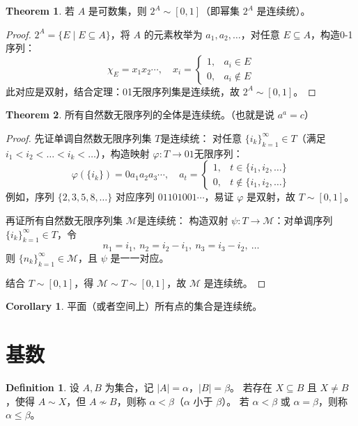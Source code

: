 \documentclass[oneside]{book}
\theoremstyle{definition}
\newtheorem{definition}{Definition}[section]
\newtheorem{theorem}{Theorem}[section]
\newtheorem{corollary}{Corollary}[section]
\begin{document}
\begin{theorem}
	若 \( A \) 是可数集，则 \( 2^A \sim [0,1] \)（即幂集 \( 2^A \) 是连续统）。
\end{theorem}

\begin{proof}
	\( 2^A = \{ E \mid E \subseteq A \} \)，将 \( A \) 的元素枚举为 \( a_1,a_2,\dots \)，对任意 \( E \subseteq A \)，构造0-1序列：
	\[
	\chi_E = x_1x_2\cdots,\quad x_i = \begin{cases}
		1, & a_i \in E \\
		0, & a_i \notin E
	\end{cases}
	\]
	此对应是双射，结合定理：01无限序列集是连续统，故 \( 2^A \sim [0,1] \)。
\end{proof}

\begin{theorem}
	所有自然数无限序列的全体是连续统。（也就是说 \(a^a=c\)）
\end{theorem}

\begin{proof}
	先证单调自然数无限序列集 \( T \)是连续统：
	对任意 \( \{i_k\}_{k=1}^\infty \in T \)（满足 \( i_1 < i_2 < \dots < i_k < \dots \)），构造映射 \( \varphi: T \to \text{01无限序列} \)：
	\[
	\varphi(\{i_k\}) = 0a_1a_2a_3\cdots,\quad a_t = \begin{cases}
		1, & t \in \{i_1,i_2,\dots\} \\
		0, & t \notin \{i_1,i_2,\dots\}
	\end{cases}
	\]
	例如，序列 \( \{2,3,5,8,\dots\} \) 对应序列 \( 01101001\cdots \)，易证 \( \varphi \) 是双射，故 \( T \sim [0,1] \)。
	
	
	再证所有自然数无限序列集 \( \mathcal{M} \)是连续统：
	构造双射 \( \psi: T \to \mathcal{M} \)：对单调序列 \( \{i_k\}_{k=1}^\infty \in T \)，令
	\[
	n_1 = i_1,\ n_2 = i_2 - i_1,\ n_3 = i_3 - i_2,\ \dots
	\]
	则 \( \{n_k\}_{k=1}^\infty \in \mathcal{M} \)，且 \( \psi \) 是一一对应。
	
	结合 \( T \sim [0,1] \)，得 \( \mathcal{M} \sim T \sim [0,1] \)，故 \( \mathcal{M} \) 是连续统。
\end{proof}
\begin{corollary}
	平面（或者空间上）所有点的集合是连续统。
\end{corollary}
\section{基数}

\begin{definition}
	设 \( A,B \) 为集合，记 \( |A| = \alpha \)，\( |B| = \beta \)。
	若存在 \( X \subseteq B \) 且 \( X \neq B \)，使得 \( A \sim X \)，但 \( A \not\sim B \)，则称 \( \alpha < \beta \)（\( \alpha \) 小于 \( \beta \)）。
	若 \( \alpha < \beta \) 或 \( \alpha = \beta \)，则称 \( \alpha \leq \beta \)。
\end{definition}
\end{document}
